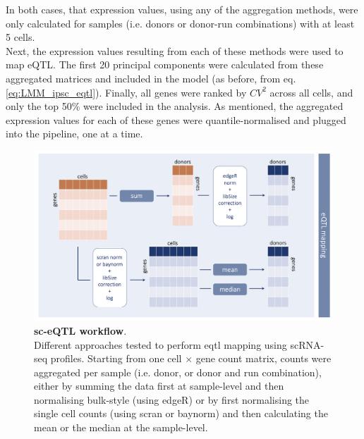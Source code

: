 In both cases, that expression values, using any of the aggregation methods, were only calculated for samples (i.e. donors or donor-run combinations) with at least 5 cells.\\

Next, the expression values resulting from each of these methods were used to map eQTL.
The first 20 principal components were calculated from these aggregated matrices and included in the model (as before, from eq. \eqref{eq:LMM_ipsc_eqtl}).
Finally, all genes were ranked by $CV^2$ across all cells, and only the top 50\% were included in the analysis. 
As mentioned, the aggregated expression values for each of these genes were quantile-normalised and plugged into the pipeline, one at a time.


\begin{figure}[h]
\centering
\includegraphics[width=16cm]{Chapter3/Fig/sc_qtl_workflow_no1_2_steps.png}
\caption[sc-eQTL workflow]{\textbf{sc-eQTL workflow}.\\
Different approaches tested to perform \gls{eqtl} mapping using scRNA-seq profiles.
Starting from one cell $\times$ gene count matrix, counts were aggregated per sample (i.e. donor, or donor and run combination), either by summing the data first at sample-level and then normalising bulk-style (using edgeR) or by first normalising the single cell counts (using scran or baynorm) and then calculating the mean or the median at the sample-level. }
\label{fig:sc_qtl_workflow}
\end{figure}

\clearpage

